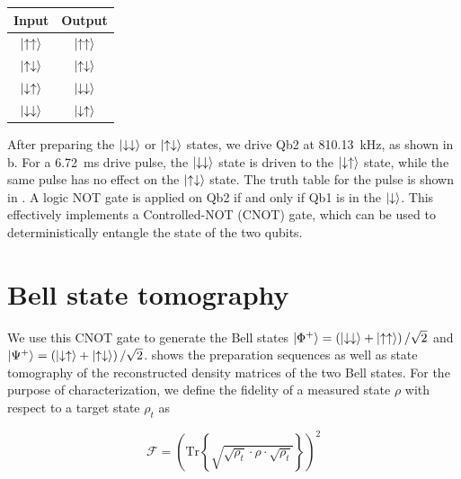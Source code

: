 \begin{margintable}
\centering
\begin{tabular}{c|c}
    \hline
    Input & Output \\
    \hline
    $\ket{\uparrow\uparrow}$   & $\ket{\uparrow\uparrow}$ \\
    $\ket{\uparrow\downarrow}$ & $\ket{\uparrow\downarrow}$ \\
    $\ket{\downarrow\uparrow}$ & $\ket{\downarrow\downarrow}$ \\
    $\ket{\downarrow\downarrow}$ & $\ket{\downarrow\uparrow}$ \\
    \hline
\end{tabular}
\caption{Truth table for a CNOT gate.}
\end{margintable}


After preparing the $\ket{\downarrow\downarrow}$ or $\ket{\uparrow\downarrow}$ states, we drive Qb2 at 810.13~kHz, as shown in b. For a 6.72~ms drive pulse, the $\ket{\downarrow\downarrow}$ state is driven to the $\ket{\downarrow\uparrow}$ state, while the same pulse has no effect on the $\ket{\uparrow\downarrow}$ state. The truth table for the pulse is shown in . A logic NOT gate is applied on Qb2 if and only if Qb1 is in the $\ket{\downarrow}$. This effectively implements a Controlled-NOT (CNOT) gate, which can be used to deterministically entangle the state of the two qubits.

\section{Bell state tomography}

We use this CNOT gate to generate the Bell states $\ket{\Phi^+} = \left(\ket{\downarrow\downarrow}+\ket{\uparrow\uparrow}\right)/\sqrt{2}$ and $\ket{\Psi^+} = \left(\ket{\downarrow\uparrow}+\ket{\uparrow\downarrow}\right)/\sqrt{2}$.  shows the preparation sequences as well as state tomography of the reconstructed density matrices of the two Bell states. For the purpose of characterization, we define the fidelity of a measured state $\rho$ with respect to a target state $\rho_t$ as 

\begin{equation}
    \mathcal{F} = \left(\text{Tr}\left\{\sqrt{\sqrt{\rho_t} \cdot \rho \cdot \sqrt{\rho_t}}\right\}\right)^2
\end{equation}

